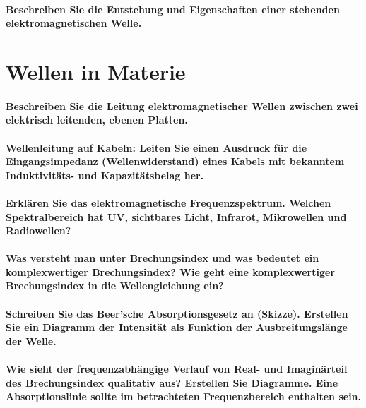 \documentclass[a4paper, 11pt, parskip=half]{scrartcl}
\begin{document}
\paragraph{Beschreiben Sie die Entstehung und Eigenschaften einer stehenden elektromagnetischen
Welle.}

\newpage

\section{Wellen in Materie}

\paragraph{Beschreiben Sie die Leitung elektromagnetischer Wellen zwischen zwei elektrisch
leitenden, ebenen Platten.}

\paragraph{Wellenleitung auf Kabeln: Leiten Sie einen Ausdruck für die Eingangsimpedanz
(Wellenwiderstand) eines Kabels mit bekanntem Induktivitäts- und Kapazitätsbelag her.}

\paragraph{Erklären Sie das elektromagnetische Frequenzspektrum. Welchen Spektralbereich hat UV,
sichtbares Licht, Infrarot, Mikrowellen und Radiowellen?}

\paragraph{Was versteht man unter Brechungsindex und was bedeutet ein komplexwertiger
Brechungsindex? Wie geht eine komplexwertiger Brechungsindex in die Wellengleichung ein?}

\paragraph{Schreiben Sie das Beer’sche Absorptionsgesetz an (Skizze). Erstellen Sie ein Diagramm der
Intensität als Funktion der Ausbreitungslänge der Welle.}

\paragraph{Wie sieht der frequenzabhängige Verlauf von Real- und Imaginärteil des Brechungsindex
qualitativ aus? Erstellen Sie Diagramme. Eine Absorptionslinie sollte im betrachteten
Frequenzbereich enthalten sein.}
\end{document}
